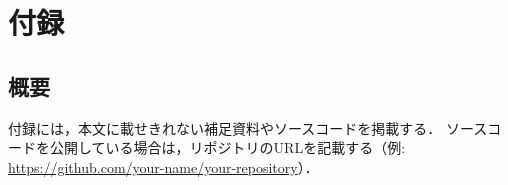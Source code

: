 \documentclass[main]{subfiles}
\begin{document}
\chapter{付録}
\section{概要}
付録には，本文に載せきれない補足資料やソースコードを掲載する．
ソースコードを公開している場合は，リポジトリのURLを記載する（例: \url{https://github.com/your-name/your-repository}）．\par


\end{document}
